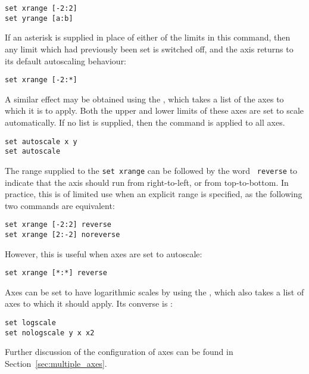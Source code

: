 \begin{verbatim}
set xrange [-2:2]
set yrange [a:b]
\end{verbatim}

If an asterisk is supplied in place of either of the limits in this command, then
any limit which had previously been set is switched off, and the axis returns to
its default autoscaling behaviour:

\begin{verbatim}
set xrange [-2:*]
\end{verbatim}

\noindent A similar effect may be obtained using the ,
which takes a list of the axes to which it is to apply. Both the upper and
lower limits of these axes are set to scale automatically. If no list is
supplied, then the command is applied to all axes.

\begin{verbatim}
set autoscale x y
set autoscale
\end{verbatim}

The range supplied to the {\tt set xrange} can be followed by the word {\tt
reverse} to indicate that the axis should run from right-to-left, or from
top-to-bottom. In practice, this is of limited use when an explicit range is
specified, as the following two commands are equivalent:

\begin{verbatim}
set xrange [-2:2] reverse
set xrange [2:-2] noreverse
\end{verbatim}

\noindent However, this is useful when axes are set to autoscale:

\begin{verbatim}
set xrange [*:*] reverse
\end{verbatim}

Axes can be set to have logarithmic scales by using the ,
which also takes a list of axes to which it should apply. Its converse is
:

\begin{verbatim}
set logscale
set nologscale y x x2
\end{verbatim}

Further discussion of the configuration of axes can be found in
Section~\ref{sec:multiple_axes}.

